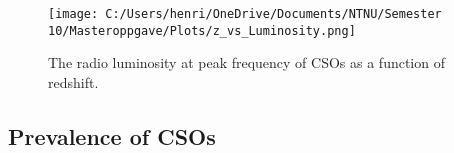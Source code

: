 \begin{figure}
    \centering
    \texttt{[image: C:/Users/henri/OneDrive/Documents/NTNU/Semester 10/Masteroppgave/Plots/z\_vs\_Luminosity.png]}
    \caption{The radio luminosity at peak frequency of CSOs as a function of redshift.}
    \label{fig:Luminosity_redshift}
\end{figure}
\subsection{Prevalence of CSOs}







